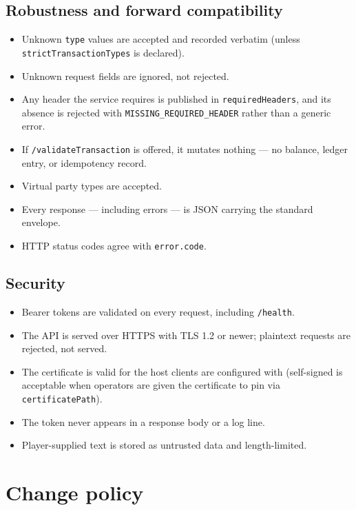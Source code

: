 \documentclass[11pt,a4paper]{article}
\newcommand{\code}[1]{\texttt{\small #1}}
\begin{document}
\subsection*{Robustness and forward compatibility}
\begin{itemize}[label=$\square$]
\item Unknown \code{type} values are accepted and recorded verbatim (unless
      \code{strictTransactionTypes} is declared).
\item Unknown request fields are ignored, not rejected.
\item Any header the service requires is published in \code{requiredHeaders}, and its absence
      is rejected with \code{MISSING\_REQUIRED\_HEADER} rather than a generic error.
\item If \code{/validateTransaction} is offered, it mutates nothing --- no balance, ledger
      entry, or idempotency record.
\item Virtual party types are accepted.
\item Every response --- including errors --- is JSON carrying the standard envelope.
\item HTTP status codes agree with \code{error.code}.
\end{itemize}

\subsection*{Security}
\begin{itemize}[label=$\square$]
\item Bearer tokens are validated on every request, including \code{/health}.
\item The API is served over HTTPS with TLS 1.2 or newer; plaintext requests are rejected, not
      served.
\item The certificate is valid for the host clients are configured with (self-signed is acceptable
      when operators are given the certificate to pin via \code{certificatePath}).
\item The token never appears in a response body or a log line.
\item Player-supplied text is stored as untrusted data and length-limited.
\end{itemize}

\section{Change policy}
\end{document}
